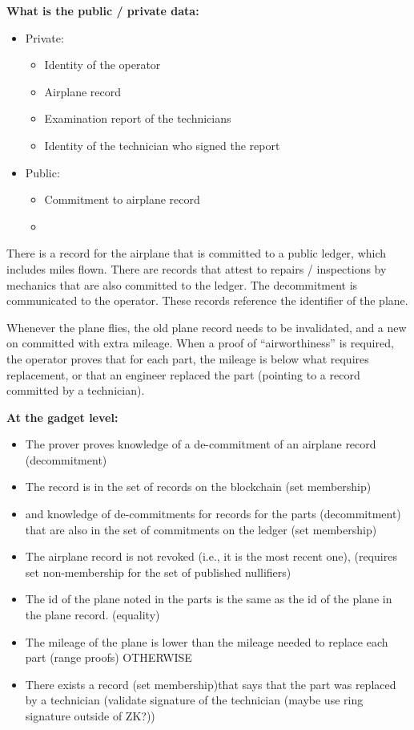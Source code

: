 \textbf{What is the public / private data:}
    \begin{itemize}
		\item Private:
        \begin{itemize}
				\item Identity of the operator
        \item Airplane record
        \item Examination report of the technicians
        \item Identity of the technician who signed the report
				\end{itemize}
    \item Public:
        \begin{itemize}
				\item Commitment to airplane record
				\item 
				\end{itemize}
		\end{itemize}

There is a record for the airplane that is committed to a public ledger, which includes miles flown. \newline
There are records that attest to repairs / inspections by mechanics that are also committed to the ledger. The decommitment is communicated to the operator. These records reference the identifier of the plane.

Whenever the plane flies, the old plane record needs to be invalidated, and a new on committed with extra mileage.  \newline
When a proof of “airworthiness” is required, the operator proves that for each part, the mileage is below what requires replacement, or that an engineer replaced the part (pointing to a record committed by a technician).

\textbf{At the gadget level: }
\begin{itemize}
    \item The prover proves knowledge of a de-commitment of an airplane record (decommitment) 
    \item The record is in the set of records on the blockchain (set membership)
    \item and knowledge of de-commitments for records for the parts (decommitment) that are also in the set of commitments on the ledger (set membership)
    \item The airplane record is not revoked (i.e., it is the most recent one), (requires set non-membership for the set of published nullifiers)
    \item The id of the plane noted in the parts is the same as the id of the plane in the plane record.  (equality) 
    \item The mileage of the plane is lower than the mileage needed to replace each part (range proofs) OTHERWISE 
    \item There exists a record (set membership)that says  that the part was replaced by a technician (validate signature of the technician (maybe use ring signature outside of ZK?))
		\end{itemize}
		
